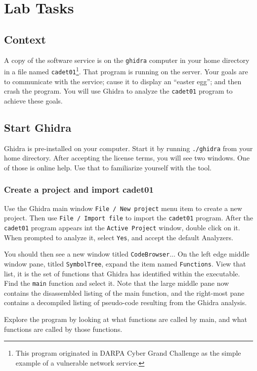 \section{Lab Tasks}
\subsection{Context}
A copy of the software service is on the {\tt ghidra} computer in your home directory
in a file named {\tt cadet01}\footnote{This program originated in DARPA Cyber Grand Challenge
as the simple example of a vulnerable network service.}.  
That program is running on the server.  Your goals are to communicate with the service; cause
it to display an ``easter egg''; and then crash the program.  You will use Ghidra to analyze the
{\tt cadet01} program to achieve these goals.

\subsection{Start Ghidra}
Ghidra is pre-installed on your computer.  Start it by running {\tt ./ghidra} from your home
directory.  After accepting the license terms, you will see two windows.  One of those is online help.
Use that to familiarize yourself with the tool.

\subsubsection{Create a project and import cadet01}
Use the Ghidra main window {\tt File / New project} menu item to create a new project.  Then use
{\tt File / Import file} to import the {\tt cadet01} program.  After the {\tt cadet01} program appears
int the {\tt Active Project} window, double click on it.  When prompted to analyze it, select {\tt Yes},
and accept the default Analyzers.

You should then see a new window titled {\tt CodeBrowser}...  On the left edge middle window pane, titled
{\tt SymbolTree}, expand the item named {\tt Functions}.  View that list, it is the set of functions that Ghidra
has identified within the executable.  Find the {\tt main} function and select it.  Note that the large middle pane
now contains the disassembled listing of the main function, and the right-most pane contains a decompiled listing of
pseudo-code resulting from the Ghidra analysis.

Explore the program by looking at what functions are called by main, and what functions are called by those functions.


